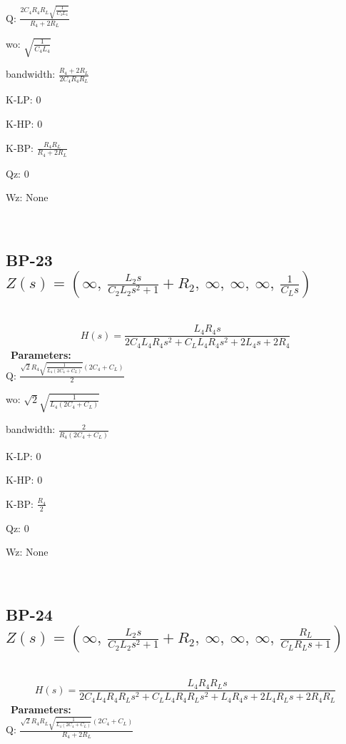 \documentclass{article}
\begin{document}
Q: $\frac{2 C_{4} R_{4} R_{L} \sqrt{\frac{1}{C_{4} L_{4}}}}{R_{4} + 2 R_{L}}$\ 

wo: $\sqrt{\frac{1}{C_{4} L_{4}}}$\ 

bandwidth: $\frac{R_{4} + 2 R_{L}}{2 C_{4} R_{4} R_{L}}$\ 

K-LP: $0$\ 

K-HP: $0$\ 

K-BP: $\frac{R_{4} R_{L}}{R_{4} + 2 R_{L}}$\ 

Qz: $0$\ 

Wz: $\text{None}$\ 

\ 

\subsection{BP-23 $Z(s) = \left( \infty, \  \frac{L_{2} s}{C_{2} L_{2} s^{2} + 1} + R_{2}, \  \infty, \  \infty, \  \infty, \  \frac{1}{C_{L} s}\right)$ } \ 
\textbf{\[H(s) = \frac{L_{4} R_{4} s}{2 C_{4} L_{4} R_{4} s^{2} + C_{L} L_{4} R_{4} s^{2} + 2 L_{4} s + 2 R_{4}}\] } \ 
\textbf{Parameters:}\\ 

Q: $\frac{\sqrt{2} R_{4} \sqrt{\frac{1}{L_{4} \left(2 C_{4} + C_{L}\right)}} \left(2 C_{4} + C_{L}\right)}{2}$\ 

wo: $\sqrt{2} \sqrt{\frac{1}{L_{4} \left(2 C_{4} + C_{L}\right)}}$\ 

bandwidth: $\frac{2}{R_{4} \left(2 C_{4} + C_{L}\right)}$\ 

K-LP: $0$\ 

K-HP: $0$\ 

K-BP: $\frac{R_{4}}{2}$\ 

Qz: $0$\ 

Wz: $\text{None}$\ 

\ 

\subsection{BP-24 $Z(s) = \left( \infty, \  \frac{L_{2} s}{C_{2} L_{2} s^{2} + 1} + R_{2}, \  \infty, \  \infty, \  \infty, \  \frac{R_{L}}{C_{L} R_{L} s + 1}\right)$ } \ 
\textbf{\[H(s) = \frac{L_{4} R_{4} R_{L} s}{2 C_{4} L_{4} R_{4} R_{L} s^{2} + C_{L} L_{4} R_{4} R_{L} s^{2} + L_{4} R_{4} s + 2 L_{4} R_{L} s + 2 R_{4} R_{L}}\] } \ 
\textbf{Parameters:}\\ 

Q: $\frac{\sqrt{2} R_{4} R_{L} \sqrt{\frac{1}{L_{4} \left(2 C_{4} + C_{L}\right)}} \left(2 C_{4} + C_{L}\right)}{R_{4} + 2 R_{L}}$\ 
\end{document}
